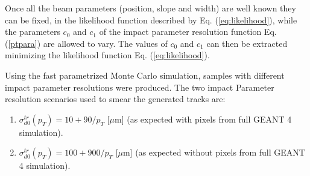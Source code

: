 \documentclass{cmspaper}
\begin{document}

Once all the beam parameters (position, slope and width) are well known they can be fixed, in the likelihood function 
described by 
Eq. (\ref{eq:likelihood}), while the parameters $c_0$ and  $c_1$ of the impact parameter resolution function 
Eq. (\ref{ptpara}) are allowed to vary. The values  of $c_0$ and $c_1$ can then be extracted
minimizing the likelihood function Eq. (\ref{eq:likelihood}).

Using the fast parametrized Monte 
Carlo simulation, samples with different impact parameter resolutions were produced. 
The two impact Parameter resolution scenarios used to smear the generated tracks are:
\begin{enumerate}
\item $\sigma^{tr}_{d0}(p_T) =10 + 90/p_T$ [$\mu$m] (as expected with pixels from full GEANT 4 simulation).
\item $\sigma^{tr}_{d0}(p_T) =100 + 900/p_T$ [$\mu$m] (as expected without pixels  from full GEANT 4 simulation).
\end{enumerate}




\end{document}
